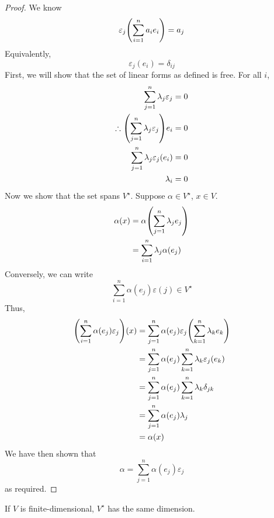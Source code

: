 \begin{proof}
	We know
	\[
		\varepsilon_j \qty( \sum_{i=1}^n a_i e_i ) = a_j
	\]
	Equivalently,
	\[
		\varepsilon_j (e_i) = \delta_{ij}
	\]
	First, we will show that the set of linear forms as defined is free.
	For all \( i \),
	\begin{align*}
		\sum_{j=1}^n \lambda_j \varepsilon_j                        & = 0 \\
		\therefore \qty( \sum_{j=1}^n \lambda_j \varepsilon_j ) e_i & = 0 \\
		\sum_{j=1}^n \lambda_j \varepsilon_j(e_i)                   & = 0 \\
		\lambda_i                                                   & = 0
	\end{align*}
	Now we show that the set spans \( V^\star \).
	Suppose \( \alpha \in V^\star \), \( x \in V \).
	\begin{align*}
		\alpha(x) & = \alpha\qty(\sum_{j=1}^n \lambda_j e_j) \\
		          & = \sum_{i=1}^n \lambda_j \alpha(e_j)
	\end{align*}
	Conversely, we can write
	\[
		\sum_{i=1}^n \alpha(e_j) \varepsilon(j) \in V^\star
	\]
	Thus,
	\begin{align*}
		\qty( \sum_{i=1}^n \alpha(e_j) \varepsilon_j) (x) & = \sum_{j=1}^n \alpha(e_j) \varepsilon_j\qty(\sum_{k=1}^n \lambda_k e_k) \\
		                                                  & = \sum_{j=1}^n \alpha(e_j) \sum_{k=1}^n \lambda_k \varepsilon_j(e_k)     \\
		                                                  & = \sum_{j=1}^n \alpha(e_j) \sum_{k=1}^n \lambda_k \delta_{jk}            \\
		                                                  & = \sum_{j=1}^n \alpha(e_j) \lambda_j                                     \\
		                                                  & = \alpha(x)
	\end{align*}
	We have then shown that
	\[
		\alpha = \sum_{j=1}^n \alpha(e_j) \varepsilon_j
	\]
	as required.
\end{proof}
\begin{corollary}
	If \( V \) is finite-dimensional, \( V^\star \) has the same dimension.
\end{corollary}
